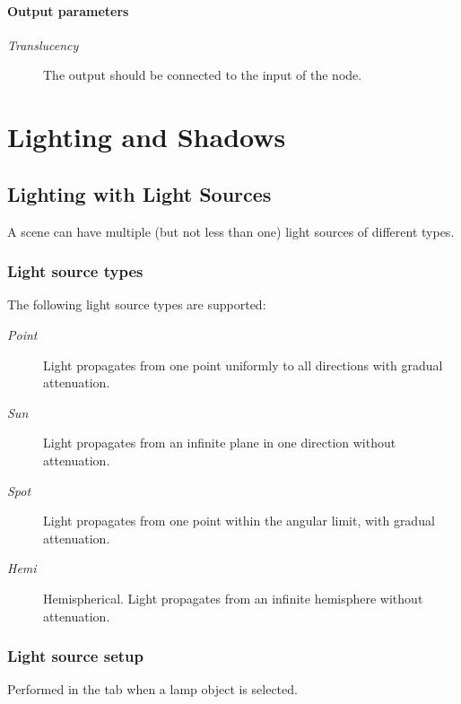 \documentclass[a4paper,12pt,oneside]{sphinxmanual}
\begin{document}
\subsubsection{Output parameters}
\label{node_materials:id7}\begin{description}
\item[{\emph{Translucency}}] \leavevmode
The output should be connected to the  input of the  node.

\end{description}
\label{lighting:lighting}

\chapter{Lighting and Shadows}
\label{lighting:index-0}\label{lighting::doc}\label{lighting:id1}

\section{Lighting with Light Sources}
\label{lighting:id2}\label{lighting:index-1}
A scene can have multiple (but not less than one) light sources of different types.


\subsection{Light source types}
\label{lighting:id3}
The following light source types are supported:
\begin{description}
\item[{\emph{Point}}] \leavevmode
Light propagates from one point uniformly to all directions with gradual attenuation.

\item[{\emph{Sun}}] \leavevmode
Light propagates from an infinite plane in one direction without attenuation.

\item[{\emph{Spot}}] \leavevmode
Light propagates from one point within the angular limit, with gradual attenuation.

\item[{\emph{Hemi}}] \leavevmode
Hemispherical. Light propagates from an infinite hemisphere without attenuation.

\end{description}


\subsection{Light source setup}
\label{lighting:id4}
Performed in the  tab when a lamp object is selected.
\end{document}
